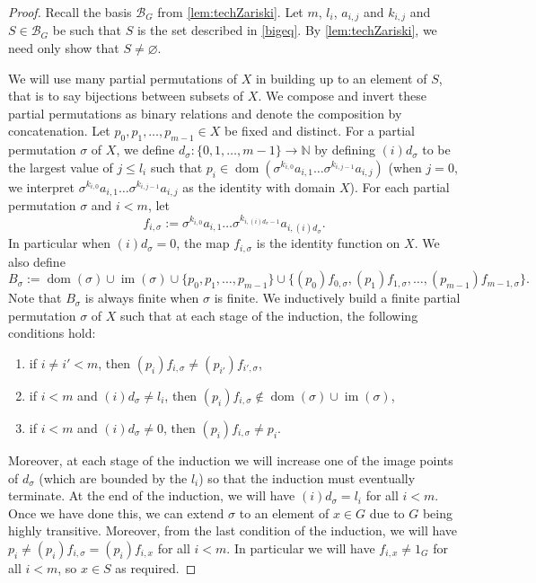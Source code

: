 \documentclass[10pt,a4paper]{amsart}
\newcommand{\N}{\mathbb N}
\newcommand{\dom}{\operatorname{dom}}
\newcommand{\im}{\operatorname{im}}
\begin{document}
\begin{proof}
   Recall the basis \(\mathcal{B}_G\) from \cref{lem:techZariski}.
Let \(m\), \(l_i\), \(a_{i,j}\) and \(k_{i,j}\) and \(S\in \mathcal{B}_G\) be such that \(S\) is the set described in  \cref{bigeq}.
    By \cref{lem:techZariski}, we need only show that \(S\neq \varnothing\).

    We will use many partial permutations of \(X\) in building up to an element of \(S\), that is to say bijections between subsets of \(X\).
     We compose and invert these partial permutations as binary relations and denote the composition by concatenation.
     Let \(p_0,p_1,\ldots, p_{m-1}\in X\) be fixed and distinct.
    For a partial permutation \(\sigma\) of \(X\), we define \(d_\sigma:\{0,1,\ldots,m-1\}\to \N\) by
     defining \((i)d_{\sigma}\) to be the largest value of \(j\leq l_i\) such that \(p_i\in \operatorname{dom}(\sigma^{k_{i,0}}a_{i,1}\ldots \sigma^{k_{i,j-1}}a_{i, j})\) (when \(j=0\), we interpret \(\sigma^{k_{i,0}}a_{i,1}\ldots \sigma^{k_{i,j-1}}a_{i, j}\) as the identity with domain \(X\)). 
     For each partial permutation \(\sigma\) and \(i<m\), let 
     \[f_{i,\sigma}:=\sigma^{k_{i,0}}a_{i,1}\ldots \sigma^{k_{i,(i)d_\sigma-1}}a_{i, (i)d_\sigma}.\]
     In particular when \((i)d_{\sigma}=0\), the map \(f_{i,\sigma}\) is the identity function on \(X\).
     We also define
     \[B_\sigma :=\dom(\sigma)\cup \im(\sigma)\cup \{p_0,p_1,\ldots,p_{m-1}\}\cup \{(p_0)f_{0,\sigma},(p_1)f_{1,\sigma},\ldots, (p_{m-1})f_{m-1,\sigma}\}.\]
     Note that \(B_\sigma\) is always finite when \(\sigma\) is finite.
     We inductively build a finite partial permutation \(\sigma\) of \(X\) such that at each stage of the induction, the following conditions hold:
     \begin{enumerate}
      \item[($\sigma$1)] if \(i\neq i'<m\), then \((p_i)f_{i,\sigma}\neq (p_{i'})f_{i',\sigma}\),
         \item[($\sigma$2)] if \(i<m\) and \((i)d_\sigma \neq l_i\), then  \((p_i)f_{i,\sigma}\notin \dom(\sigma)\cup \im(\sigma)\),
         \item[($\sigma$3)] if \(i<m\) and \((i)d_\sigma\neq 0\), then  \((p_i)f_{i,\sigma}\neq p_i\).
     \end{enumerate}
     Moreover, at each stage of the induction we will increase one of the image points of \(d_\sigma\) (which are bounded by the \(l_i\)) so that the induction must eventually terminate. 
     At the end of the induction, we will have \((i)d_\sigma=l_i\) for all \(i<m\). 
     Once we have done this, we can extend \(\sigma\) to an element of \(x\in G\) due to \(G\) being highly transitive. Moreover, from the last condition of the induction, we will have \(p_i\neq (p_i)f_{i,\sigma}=(p_i)f_{i,x}\) for all \(i<m\). In particular we will have \(f_{i,x}\neq 1_G\) for all \(i<m\), so \(x\in S\) as required.


\end{proof}
\end{document}
